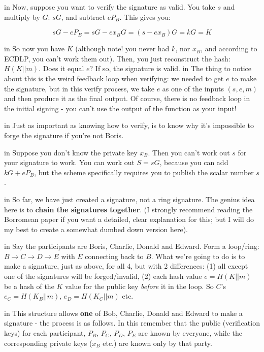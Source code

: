 \documentclass[10pt,a4paper]{article}
\begin{document}
 in \noindent Now, suppose you want to verify the signature as valid. You take $s$ and multiply by $G$: $sG$, and subtract $eP_B$. This gives you:

\[sG - eP_B = sG - ex_{B}G = (s - ex_{B})G = kG = K \]

 in \noindent So now you have $K$ (although note! you never had $k$, nor $x_B$, and according to ECDLP, you can't work them out).
Then, you just reconstruct the hash: $H(K || m)$. Does it equal $e$? If so, the signature is valid.
 in \noindent The thing to notice about this is the weird feedback loop when verifying: we needed to get $e$ to make the signature, but in this verify process, we take $e$ as one of the inputs $(s,e,m)$ and then produce it as the final output. Of course, there is no feedback loop in the initial signing - you can't use the output of the function as your input!

 in \noindent Just as important as knowing how to verify, is to know why it's impossible to forge the signature if you're not Boris.

 in \noindent Suppose you don't know the private key $x_B$. Then you can't work out $s$ for your signature to work. You can work out $S = sG$, because you can add $kG + eP_B$, but the scheme specifically requires you to publish the scalar number $s$.

 in \noindent So far, we have just created a signature, not a ring signature. The genius idea here is to \textbf{chain the signatures together}. (I strongly recommend reading the Borromean paper \cite{borromean} if you want a detailed, clear explanation for this; but I will do my best to create a somewhat dumbed down version here).

 in \noindent Say the participants are Boris, Charlie, Donald and Edward. Form a loop/ring: $B \rightarrow C \rightarrow D \rightarrow E$ with $E$ connecting back to $B$. What we're going to do is to make a signature, just as above, for all 4, but with 2 differences: (1) all except one of the signatures will be forged/invalid, (2) each hash value $e = H(K||m)$ be a hash of the $K$ value for the public key \textit{before} it in the loop. So $C$'s $e_C = H(K_B || m)$, $e_D = H(K_C||m)$ etc.

 in \noindent This structure allows \textbf{one} of Bob, Charlie, Donald and Edward to make a signature - the process is as follows. In this remember that the public (verification keys) for each participant, $P_B$, $P_C$, $P_D$, $P_E$ are known by everyone, while the corresponding private keys ($x_B$ etc.) are known only by that party.
\end{document}
